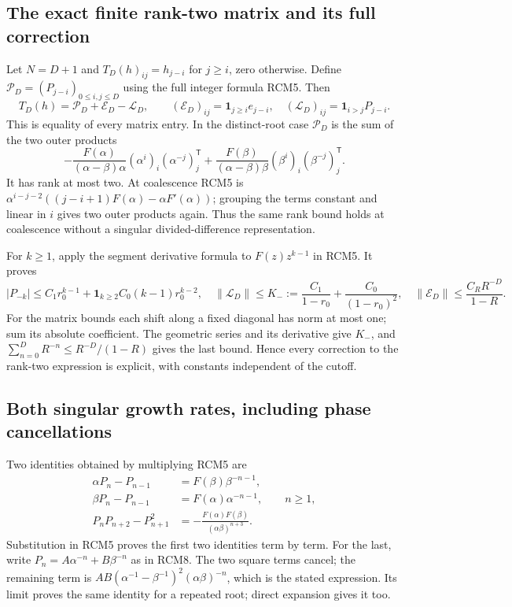\documentclass[11pt]{article}
\begin{document}
\subsection{The exact finite rank-two matrix and its full correction}
Let $N=D+1$ and $T_D(h)_{ij}=h_{j-i}$ for $j\ge i$, zero
otherwise.  Define $\mathcal P_D=(P_{j-i})_{0\le i,j\le D}$
using the full integer formula RCM5.  Then
\[
 T_D(h)=\mathcal P_D+\mathcal E_D-\mathcal L_D,
 \qquad
 (\mathcal E_D)_{ij}=\boldsymbol1_{j\ge i}e_{j-i},\quad
 (\mathcal L_D)_{ij}=\boldsymbol1_{i>j}P_{j-i}.
 \tag{RCM7}
\]
This is equality of every matrix entry.  In the distinct-root
case $\mathcal P_D$ is the sum of the two outer products
\[
 -\frac{F(\alpha)}{(\alpha-\beta)\alpha}
   (\alpha^i)_i(\alpha^{-j})_j^{\mathsf T}
 +\frac{F(\beta)}{(\alpha-\beta)\beta}
   (\beta^i)_i(\beta^{-j})_j^{\mathsf T}.
 \tag{RCM8}
\]
It has rank at most two.  At coalescence RCM5 is
$\alpha^{i-j-2}((j-i+1)F(\alpha)-\alpha F'(\alpha))$;
grouping the terms constant and linear in $i$ gives two outer
products again.  Thus the same rank bound holds at coalescence
without a singular divided-difference representation.

For $k\ge1$, apply the segment derivative formula to
$F(z)z^{k-1}$ in RCM5.  It proves
\[
 |P_{-k}|\le C_1r_0^{k-1}+
   \boldsymbol1_{k\ge2}C_0(k-1)r_0^{k-2},\quad
 \|\mathcal L_D\|\le
 K_-:=\frac{C_1}{1-r_0}+\frac{C_0}{(1-r_0)^2},\quad
 \|\mathcal E_D\|\le\frac{C_R R^{-D}}{1-R}.
 \tag{RCM9}
\]
For the matrix bounds each shift along a fixed diagonal has norm
at most one; sum its absolute coefficient.  The geometric series
and its derivative give $K_-$, and
$\sum_{n=0}^D R^{-n}\le R^{-D}/(1-R)$ gives the last bound.
Hence every correction to the rank-two expression is explicit,
with constants independent of the cutoff.

\subsection{Both singular growth rates, including phase cancellations}
Two identities obtained by multiplying RCM5 are
\[
 \begin{aligned}
 \alpha P_n-P_{n-1}&=F(\beta)\beta^{-n-1},\\
 \beta P_n-P_{n-1}&=F(\alpha)\alpha^{-n-1},\qquad n\ge1,\\
 P_nP_{n+2}-P_{n+1}^2
     &=-\frac{F(\alpha)F(\beta)}{(\alpha\beta)^{n+3}}.
 \end{aligned}\tag{RCM10}
\]
Substitution in RCM5 proves the first two identities term by term.
For the last, write $P_n=A\alpha^{-n}+B\beta^{-n}$ as in
RCM8.  The two square terms cancel; the remaining term is
$AB(\alpha^{-1}-\beta^{-1})^2(\alpha\beta)^{-n}$,
which is the stated expression.  Its limit proves the same
identity for a repeated root; direct expansion gives it too.
\end{document}
